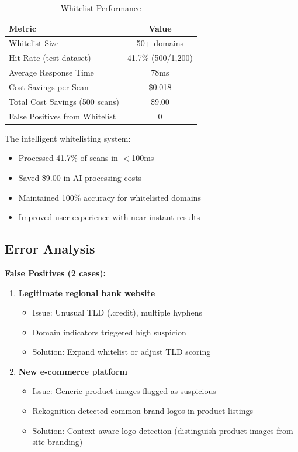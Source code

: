 \documentclass[conference]{IEEEtran}
\begin{document}
\begin{table}[htbp]
\caption{Whitelist Performance}
\begin{center}
\begin{tabular}{|l|c|}
\hline
\textbf{Metric} & \textbf{Value} \\
\hline
Whitelist Size & 50+ domains \\
\hline
Hit Rate (test dataset) & 41.7\% (500/1,200) \\
\hline
Average Response Time & 78ms \\
\hline
Cost Savings per Scan & \$0.018 \\
\hline
Total Cost Savings (500 scans) & \$9.00 \\
\hline
False Positives from Whitelist & 0 \\
\hline
\end{tabular}
\end{center}
\end{table}

The intelligent whitelisting system:
\begin{itemize}
\item Processed 41.7\% of scans in $<$100ms
\item Saved \$9.00 in AI processing costs
\item Maintained 100\% accuracy for whitelisted domains
\item Improved user experience with near-instant results
\end{itemize}

\subsection{Error Analysis}

\textbf{False Positives (2 cases):}

\begin{enumerate}
\item \textbf{Legitimate regional bank website}
  \begin{itemize}
  \item Issue: Unusual TLD (.credit), multiple hyphens
  \item Domain indicators triggered high suspicion
  \item Solution: Expand whitelist or adjust TLD scoring
  \end{itemize}

\item \textbf{New e-commerce platform}
  \begin{itemize}
  \item Issue: Generic product images flagged as suspicious
  \item Rekognition detected common brand logos in product listings
  \item Solution: Context-aware logo detection (distinguish product images from site branding)
  \end{itemize}
\end{enumerate}
\end{document}
